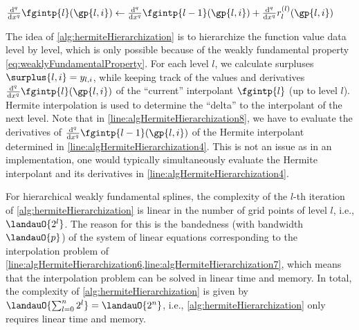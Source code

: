 \begin{algorithm}
\begin{algorithmic}[1]
{              %
              $\frac{\diff^q}{\dx^q} \fgintp{l}(\gp{l,i})
              \gets \frac{\diff^q}{\dx^q} \fgintp{l-1}(\gp{l,i}) +
              \frac{\diff^q}{\dx^q} r^{(l)}_l(\gp{l,i})$%
            }
            \label{line:algHermiteHierarchization8}
          \EndFor{}
        \EndFor{}
      \EndFor{}
    \EndFunction{}
  \end{algorithmic}
  \caption[%
    Hermite hierarchization%
  ]{%
    Hermite hierarchization on one-dimensional regular grids.
    Inputs are the level $n$ of the regular grid
    the vector $\vlinin = (\linin{l,i})_{(l,i) \in \liset}$
    of input data (function values $\fcnval{l,i}$ at the grid points),
    where $\liset = \{(l, i) \mid l = 0, \dotsc, n,\; i \in \hiset{l}\}$.
    The output is the vector
    $\vlinout = (\linout{l,i})_{(l,i) \in \liset}$
    of output data (hierarchical surpluses $\surplus{l,i}$).%
  }%
  \label{alg:hermiteHierarchization}%
\end{algorithm}

The idea of \cref{alg:hermiteHierarchization} is to
hierarchize the function value data level by level,
which is only possible because of the weakly fundamental property
\eqref{eq:weaklyFundamentalProperty}.
For each level $l$, we calculate surpluses
$\surplus{l,i} = \linout{l,i}$, while keeping track of
the values and derivatives
$\frac{\diff^q}{\dx^q} \fgintp{l}(\gp{l,i})$ of the
``current'' interpolant $\fgintp{l}$ (up to level $l$).
Hermite interpolation is used to determine the ``delta''
to the interpolant of the next level.
Note that in \cref{line:algHermiteHierarchization8},
we have to evaluate the derivatives of
$\frac{\diff^q}{\dx^q} \fgintp{l-1}(\gp{l,i})$ of the Hermite interpolant
determined in \cref{line:algHermiteHierarchization4}.
This is not an issue as in an implementation,
one would typically simultaneously evaluate the
Hermite interpolant and its derivatives in
\cref{line:algHermiteHierarchization4}.

For hierarchical weakly fundamental splines,
the complexity of the $l$-th iteration of \cref{alg:hermiteHierarchization}
is linear in the number of grid points of level $l$, i.e., $\landauO{2^l}$.
The reason for this is the bandedness (with bandwidth $\landauO{p}$) of the
system of linear equations corresponding to the interpolation problem of
\cref{line:algHermiteHierarchization6,line:algHermiteHierarchization7},
which means that the interpolation problem can be solved in
linear time and memory.
In total, the complexity of \cref{alg:hermiteHierarchization} is
given by $\landauO{\sum_{l=0}^n 2^l} = \landauO{2^n}$, i.e.,
\cref{alg:hermiteHierarchization} only requires linear time and memory.


